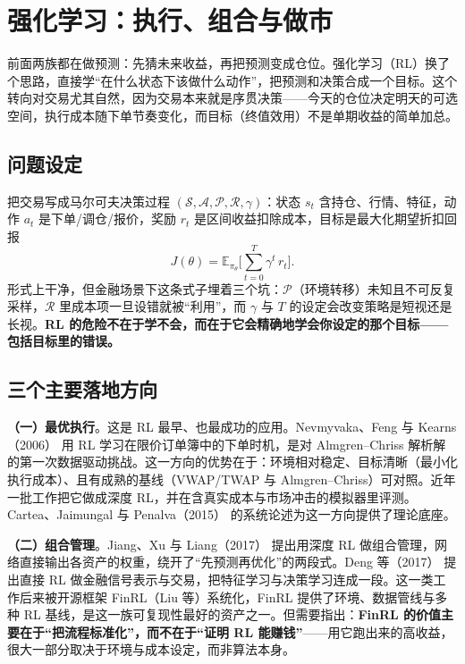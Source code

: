 \section{强化学习：执行、组合与做市}\label{sec:rl}

前面两族都在做预测：先猜未来收益，再把预测变成仓位。强化学习（RL）换了个思路，直接学“在什么状态下该做什么动作”，把预测和决策合成一个目标。这个转向对交易尤其自然，因为交易本来就是序贯决策——今天的仓位决定明天的可选空间，执行成本随下单节奏变化，而目标（终值效用）不是单期收益的简单加总。

\subsection{问题设定}

把交易写成马尔可夫决策过程 $(\mathcal{S},\mathcal{A},\mathcal{P},\mathcal{R},\gamma)$：状态 $s_t$ 含持仓、行情、特征，动作 $a_t$ 是下单/调仓/报价，奖励 $r_t$ 是区间收益扣除成本，目标是最大化期望折扣回报
\begin{equation}
  J(\theta) = \mathbb{E}_{\pi_\theta}\Big[\sum_{t=0}^{T}\gamma^t\, r_t\Big].
\end{equation}
形式上干净，但金融场景下这条式子埋着三个坑：$\mathcal{P}$（环境转移）未知且不可反复采样，$\mathcal{R}$ 里成本项一旦设错就被“利用”，而 $\gamma$ 与 $T$ 的设定会改变策略是短视还是长视。\textbf{RL 的危险不在于学不会，而在于它会精确地学会你设定的那个目标——包括目标里的错误。}

\subsection{三个主要落地方向}

\textbf{（一）最优执行}。这是 RL 最早、也最成功的应用。Nevmyvaka、Feng 与 Kearns（2006）\cite{nevmyvaka2006} 用 RL 学习在限价订单簿中的下单时机，是对 Almgren--Chriss 解析解的第一次数据驱动挑战。这一方向的优势在于：环境相对稳定、目标清晰（最小化执行成本）、且有成熟的基线（VWAP/TWAP 与 Almgren--Chriss）可对照。近年一批工作把它做成深度 RL，并在含真实成本与市场冲击的模拟器里评测。Cartea、Jaimungal 与 Penalva（2015）\cite{cartea2015} 的系统论述为这一方向提供了理论底座。

\textbf{（二）组合管理}。Jiang、Xu 与 Liang（2017）\cite{jiang2017} 提出用深度 RL 做组合管理，网络直接输出各资产的权重，绕开了“先预测再优化”的两段式。Deng 等（2017）\cite{deng2017} 提出直接 RL 做金融信号表示与交易，把特征学习与决策学习连成一段。这一类工作后来被开源框架 FinRL（Liu 等\cite{liu2021finrl}）系统化，FinRL 提供了环境、数据管线与多种 RL 基线，是这一族可复现性最好的资产之一。但需要指出：\textbf{FinRL 的价值主要在于“把流程标准化”，而不在于“证明 RL 能赚钱”}——用它跑出来的高收益，很大一部分取决于环境与成本设定，而非算法本身。

